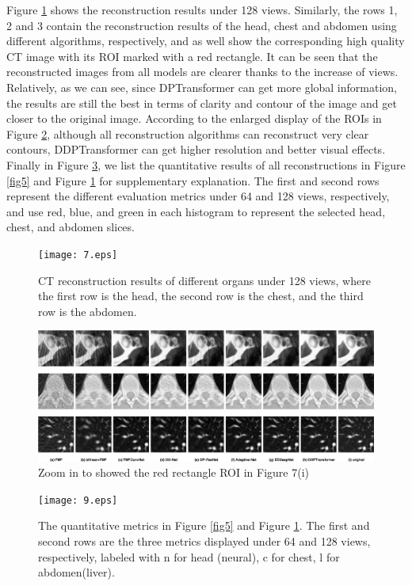 \documentclass[lettersize,journal]{IEEEtran}
\begin{document}
Figure \ref{fig7} shows the reconstruction results under 128 views. Similarly, the rows 1, 2 and 3 contain the reconstruction results of  the head, chest and abdomen using different algorithms, respectively, and as well show the corresponding high quality CT image with its ROI marked with a red rectangle. It can be seen that the reconstructed images from all models are clearer thanks to the increase of views. Relatively, as we can see, since DPTransformer can get more global information, the results are still the best in terms of clarity and contour of the image and get closer to the original image. According to the enlarged display of the ROIs in Figure \ref{fig8}, although all reconstruction algorithms can reconstruct very clear contours, DDPTransformer can get higher resolution and better visual effects. Finally in Figure \ref{fig9}, we list the quantitative results of all reconstructions in Figure \ref{fig5} and Figure \ref{fig7} for supplementary explanation. The first and second rows represent the different evaluation metrics under 64 and 128 views, respectively, and use red, blue, and green in each histogram to represent the selected head, chest, and abdomen slices.\par
\begin{figure}[!t]
	\centering
	\texttt{[image: 7.eps]}
	\caption{CT reconstruction results of different organs under 128 views, where the first row is the head, the second row is the chest, and the third row is the abdomen.}
	\label{fig7}
\end{figure}
\begin{figure}[!t]
	\centering
	\includegraphics[width=6.5in]{8.eps}
	\caption{Zoom in to showed the red rectangle ROI in Figure 7(i)}
	\label{fig8}
\end{figure}
\begin{figure}[!t]
	\centering
	\texttt{[image: 9.eps]}
	\caption{The quantitative metrics in Figure \ref{fig5} and Figure \ref{fig7}. The first and second rows are the three metrics displayed under 64 and 128 views, respectively, labeled with n for head (neural), c for chest, l for abdomen(liver).}
	\label{fig9}
\end{figure}
\end{document}
